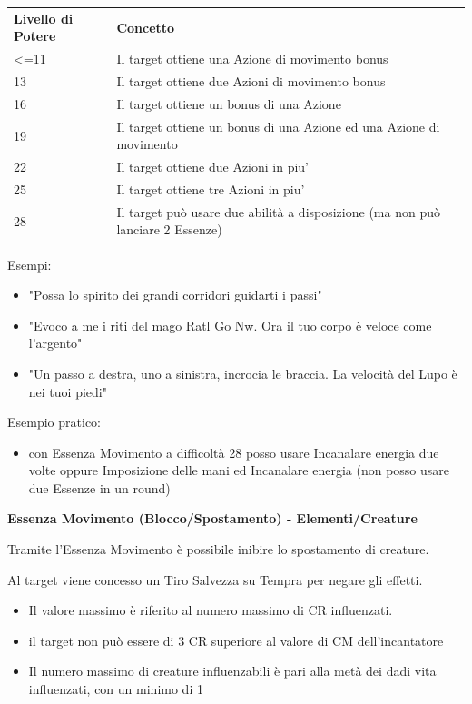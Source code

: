 \documentclass[a4paper,10 pt,twoside,openany]{book}
\begin{document}
\begin{tabularx}{0.95\textwidth}{lX}
	\toprule
	\textbf{Livello di Potere} & \textbf{Concetto}\\
	\textless=11         & Il target ottiene una Azione di movimento bonus\\
	13       & Il target ottiene due Azioni di movimento bonus\\
	16       & Il target ottiene un bonus di una Azione\\
	19       & Il target ottiene un bonus di una Azione ed una Azione di movimento\\
	22       & Il target ottiene due Azioni in piu'\\
	25       & Il target ottiene tre Azioni in piu'\\
	28       & Il target può usare due abilità a disposizione (ma non può lanciare 2 Essenze)\\
\end{tabularx}

\bigskip

Esempi:
\begin{itemize}
	\item
	"Possa lo spirito dei grandi corridori guidarti i passi"
	\item
	"Evoco a me i riti del mago Ratl Go Nw. Ora il tuo corpo è veloce come l'argento"
	\item
	"Un passo a destra, uno a sinistra, incrocia le braccia. La velocità del Lupo è nei tuoi piedi"
\end{itemize}
Esempio pratico:
\begin{itemize}
	\item
	con Essenza Movimento a difficoltà 28 posso usare Incanalare energia due volte oppure Imposizione delle mani ed Incanalare energia (non posso usare due Essenze in un round)
\end{itemize}

\bigskip

\textbf{Essenza Movimento (Blocco/Spostamento) - Elementi/Creature}

Tramite l'Essenza Movimento è possibile inibire lo spostamento di creature.

Al target viene concesso un Tiro Salvezza su Tempra per negare gli effetti.
\begin{itemize}
	\item
	Il valore massimo è riferito al numero massimo di CR influenzati.
	\item
	il target non può essere di 3 CR superiore al valore di CM dell'incantatore
	\item
	Il numero massimo di creature influenzabili è pari alla metà dei dadi vita influenzati, con un minimo di 1
\end{itemize}
\end{document}
